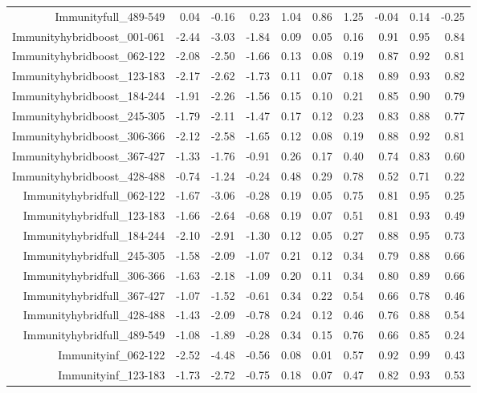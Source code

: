 \begin{table}[ht]
\begin{tabular}{rrrrrrrrrr}
  Immunityfull\_489-549 & 0.04 & -0.16 & 0.23 & 1.04 & 0.86 & 1.25 & -0.04 & 0.14 & -0.25 \\ 
  Immunityhybridboost\_001-061 & -2.44 & -3.03 & -1.84 & 0.09 & 0.05 & 0.16 & 0.91 & 0.95 & 0.84 \\ 
  Immunityhybridboost\_062-122 & -2.08 & -2.50 & -1.66 & 0.13 & 0.08 & 0.19 & 0.87 & 0.92 & 0.81 \\ 
  Immunityhybridboost\_123-183 & -2.17 & -2.62 & -1.73 & 0.11 & 0.07 & 0.18 & 0.89 & 0.93 & 0.82 \\ 
  Immunityhybridboost\_184-244 & -1.91 & -2.26 & -1.56 & 0.15 & 0.10 & 0.21 & 0.85 & 0.90 & 0.79 \\ 
  Immunityhybridboost\_245-305 & -1.79 & -2.11 & -1.47 & 0.17 & 0.12 & 0.23 & 0.83 & 0.88 & 0.77 \\ 
  Immunityhybridboost\_306-366 & -2.12 & -2.58 & -1.65 & 0.12 & 0.08 & 0.19 & 0.88 & 0.92 & 0.81 \\ 
  Immunityhybridboost\_367-427 & -1.33 & -1.76 & -0.91 & 0.26 & 0.17 & 0.40 & 0.74 & 0.83 & 0.60 \\ 
  Immunityhybridboost\_428-488 & -0.74 & -1.24 & -0.24 & 0.48 & 0.29 & 0.78 & 0.52 & 0.71 & 0.22 \\ 
  Immunityhybridfull\_062-122 & -1.67 & -3.06 & -0.28 & 0.19 & 0.05 & 0.75 & 0.81 & 0.95 & 0.25 \\ 
  Immunityhybridfull\_123-183 & -1.66 & -2.64 & -0.68 & 0.19 & 0.07 & 0.51 & 0.81 & 0.93 & 0.49 \\ 
  Immunityhybridfull\_184-244 & -2.10 & -2.91 & -1.30 & 0.12 & 0.05 & 0.27 & 0.88 & 0.95 & 0.73 \\ 
  Immunityhybridfull\_245-305 & -1.58 & -2.09 & -1.07 & 0.21 & 0.12 & 0.34 & 0.79 & 0.88 & 0.66 \\ 
  Immunityhybridfull\_306-366 & -1.63 & -2.18 & -1.09 & 0.20 & 0.11 & 0.34 & 0.80 & 0.89 & 0.66 \\ 
  Immunityhybridfull\_367-427 & -1.07 & -1.52 & -0.61 & 0.34 & 0.22 & 0.54 & 0.66 & 0.78 & 0.46 \\ 
  Immunityhybridfull\_428-488 & -1.43 & -2.09 & -0.78 & 0.24 & 0.12 & 0.46 & 0.76 & 0.88 & 0.54 \\ 
  Immunityhybridfull\_489-549 & -1.08 & -1.89 & -0.28 & 0.34 & 0.15 & 0.76 & 0.66 & 0.85 & 0.24 \\ 
  Immunityinf\_062-122 & -2.52 & -4.48 & -0.56 & 0.08 & 0.01 & 0.57 & 0.92 & 0.99 & 0.43 \\ 
  Immunityinf\_123-183 & -1.73 & -2.72 & -0.75 & 0.18 & 0.07 & 0.47 & 0.82 & 0.93 & 0.53 \\ 

\end{tabular}
\end{table}
